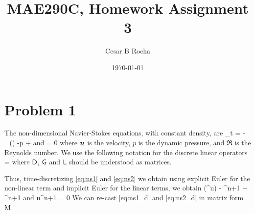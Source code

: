 \documentclass[11pt]{article}
\title{MAE290C, Homework Assignment 3}
\author{Cesar B Rocha}
\date{\today}
\begin{document}

\maketitle

\section*{Problem 1}

The non-dimensional Navier-Stokes equations, with constant density, are
\beq
\label{eq:ns1}
\p_t \bu = - \underbrace{\bu\cdot\nabla\bu}_{ \bN(\bu)}  -\nabla p + \nabla\cdot\nabla\bu\com 
\eeq
and
\beq
\label{eq:ns2}
\nabla\cdot\bu = 0\com
\eeq
where $\boldsymbol{u}$ is the velocity, $p$ is the dynamic pressure, and $\Re$ is the Reynolds number. We use the following
 notation for the discrete linear operators
 \beq
    \sD \approx \nabla\cdot\com\qquad  \sG \approx\nabla \com\qqand\sL =  \sD \sG\com
 \eeq   
 where $\mathsf{D}$, $\mathsf{G}$ and $\mathsf{L}$ should be understood as matrices.

Thus, time-discretizing \eqref{eq:ns1} and \eqref{eq:ns2} we obtain using explicit Euler for the non-linear term
 and implicit Euler for the linear terms, we obtain
 \beq
    \label{eq:ns1_d}
     \approx \bN(\bu^{n}) - \sG \bu^{n+1} +  \sD\sG \bu^{n+1}\com 
 \eeq
and
\beq
    \label{eq:ns2_d}
    \sD u^{n+1} = 0\per
\eeq
We can re-cast \eqref{eq:ns1_d} and \eqref{eq:ns2_d} in matrix form
\beq
    \label{eq:ns_d}
   M 
\eeq



\end{document}

